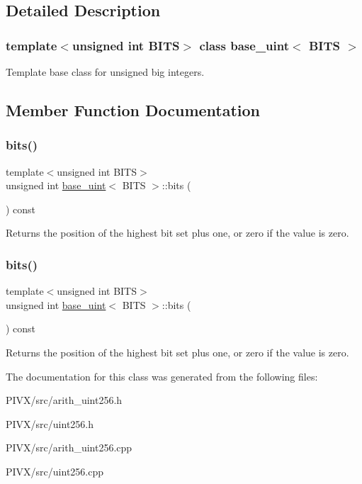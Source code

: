 \subsection{Detailed Description}
\subsubsection*{template$<$unsigned int B\+I\+TS$>$\newline
class base\+\_\+uint$<$ B\+I\+T\+S $>$}

Template base class for unsigned big integers. 

\subsection{Member Function Documentation}
\mbox{\label{classbase__uint_afe1eacc0b592cf184ac8ee0446997fbe}} 
\subsubsection{\texorpdfstring{bits()}{bits()}\hspace{0.1cm}{\footnotesize\ttfamily [1/2]}}
{\footnotesize\ttfamily template$<$unsigned int B\+I\+TS$>$ \\
unsigned int \mbox{\hyperlink{classbase__uint}{base\+\_\+uint}}$<$ B\+I\+TS $>$\+::bits (\begin{DoxyParamCaption}{ }\end{DoxyParamCaption}) const}

Returns the position of the highest bit set plus one, or zero if the value is zero. \mbox{\label{classbase__uint_afe1eacc0b592cf184ac8ee0446997fbe}} 
\subsubsection{\texorpdfstring{bits()}{bits()}\hspace{0.1cm}{\footnotesize\ttfamily [2/2]}}
{\footnotesize\ttfamily template$<$unsigned int B\+I\+TS$>$ \\
unsigned int \mbox{\hyperlink{classbase__uint}{base\+\_\+uint}}$<$ B\+I\+TS $>$\+::bits (\begin{DoxyParamCaption}{ }\end{DoxyParamCaption}) const}

Returns the position of the highest bit set plus one, or zero if the value is zero. 

The documentation for this class was generated from the following files\+:\begin{DoxyCompactItemize}
\item 
P\+I\+V\+X/src/arith\+\_\+uint256.\+h\item 
P\+I\+V\+X/src/uint256.\+h\item 
P\+I\+V\+X/src/arith\+\_\+uint256.\+cpp\item 
P\+I\+V\+X/src/uint256.\+cpp\end{DoxyCompactItemize}
